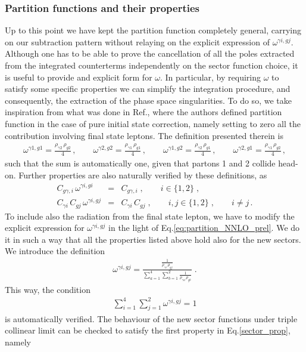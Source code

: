 \documentclass[12pt,a4paper]{article}
\newcommand{\nn}{\nonumber}
\newcommand{\beq}{\begin{eqnarray}}
\newcommand{\eeq}{\end{eqnarray}}
\begin{document}
\subsubsection{Partition functions and their properties}
\label{subsec:partition_function}
Up to this point we have kept the partition function completely general, carrying on our
subtraction pattern without relaying on the explicit expression of $\omega^{\gamma i, g j}$.
Although one has to be able to prove the cancellation of all the poles extracted from the integrated counterterms independently on the sector function choice, it is useful to provide and explicit form for $\omega$. In particular, by requiring $\omega$ to satisfy some specific properties we can simplify the integration procedure, and consequently, the extraction of the phase space singularities. To do so, we take inspiration from what was done in Ref.{\color{red}{add reference}}, where the authors defined partition function in the case of pure initial state correction, namely setting to zero all the contribution involving final state leptons. The definition presented therein is 
\beq
\omega^{\gamma1,g1} = \frac{\rho_{\gamma2} \, \rho_{g2}}{4} \, ,
\qquad 
\omega^{\gamma2,g2} = \frac{\rho_{\gamma1} \, \rho_{g1}}{4} \, ,
\qquad
\omega^{\gamma1,g2} = \frac{\rho_{\gamma2} \, \rho_{g1}}{4} \, ,
\qquad
\omega^{\gamma2,g1} = \frac{\rho_{\gamma1} \, \rho_{g2}}{4} \, ,
\eeq
such that the sum is automatically one, given that partons 1 and 2 collide head-on.
Further properties are also naturally verified by these definitions, as
\beq
C_{g\gamma,i} \, \omega^{\gamma i,gi} & = & C_{g\gamma,i} \; , \qquad i \in \{1,2\} \; ,
\nn \\
C_{\gamma i} \, C_{g j} \, \omega^{\gamma i,g j} &=& C_{\gamma i} \, C_{gj} \; , \qquad i, j \in \{1,2\}  \; , \qquad i\neq j \, .
\label{sector_prop}
\eeq
To include also the radiation from the final state lepton, we have to modify the explicit expression for  $\omega^{\gamma i, g j}$ in the light of Eq.\eqref{eq:partition_NNLO_prel}. We do it in such a way that all the properties listed above hold also for the new sectors.
We introduce the definition 
\beq
\omega^{\gamma i, g j} = \frac{\frac{1}{\rho_{\gamma i} \, \rho_{g j}}}{ \sum_{a=1}^4\sum_{b=1}^2   \frac{1}{\rho_{\gamma a} \, \rho_{g b}}} \; .
\label{new_sector}
\eeq
This way, the condition 
\beq
 \sum_{i=1}^4\sum_{j=1}^2   \omega^{\gamma i,gj}  = 1
\eeq
is automatically verified. The behaviour of the new sector functions under triple collinear limit can be checked to satisfy the first property in Eq.\eqref{sector_prop}, namely
\end{document}
